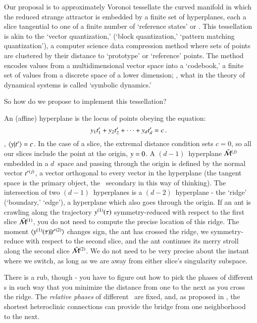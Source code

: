 Our proposal is to approximately
{Voronoi
tessellate}  the curved manifold in which the reduced strange attractor
is embedded by a finite set of hyperplanes, each a slice
tangential to one of a finite number of `reference states' or
{\template}. This tessellation is akin to the
{`vector quantization,'} (`block quantization,'  `pattern matching quantization'),
a computer science data compression method where sets of points are
clustered by their distance to `prototype' or `reference' points. The
method encodes values from a multidimensional vector space into a
`codebook,' a finite set of values from a discrete space of a lower
dimension; \ie, what in the theory of dynamical systems is called
`symbolic dynamics.'

So how do we propose to implement this tessellation?

An (affine) hyperplane is the locus of points obeying the equation:
\[
y_1t'_{1} + y_2t'_{2} + \cdots + y_dt'_{d} = c
\,.
\]
\ie, $\braket{\sspRed}{\sliceTan{}}=c$. In the case of a slice, the
extremal distance condition  sets $c=0$, so all our
slices include the point at the origin, $y=0$. A $(d\!-\!1)$\dmn\
hyperplane $\bar{\cal M}{}^{(j)}$ embedded in a $d$\dmn\ space and passing
through the origin is defined by the normal vector $t'_{}{}^{(j)}$,
a vector orthogonal to every vector in the hyperplane (the tangent space
\sliceTan{} is the primary object, the {\template} \slicep\ secondary in
this way of thinking). The intersection of two $(d\!-\!1)$\dmn\
hyperplanes is a $(d\!-\!2)$\dmn\ hyperplane - the `ridge' (`boundary,'
`edge'), a hyperplane which also goes through the origin. If an ant is
crawling along the trajectory $y{}^{(1)}(\tau)$ symmetry-reduced
with respect to the first slice $\bar{\cal M}{}^{(1)}$, you do not need to
compute the precise location of this ridge. The moment
$\braket{\sspRed{}^{(1)}(\tau)}{\sliceTan{}{}^{(2)}}$ changes sign, the
ant has crossed the ridge, we symmetry-reduce with respect to the second
slice, and the ant continues its merry stroll along the second slice
$\bar{\cal M}{}^{(2)}$. We do not need to be very precise about the instant
where we switch, as long as we are away from either slice's singularity
subspace.

There is a rub, though - you have to figure out how to pick the phases of
different {\template s} in such way that you
minimize the distance from one to the next as you cross the ridge.
The {\em relative phases} of different \reqva\ are fixed, and, as
proposed in \refref{SCD07}, the shortest heteroclinic connections
can provide the bridge from one neighborhood to the next.

